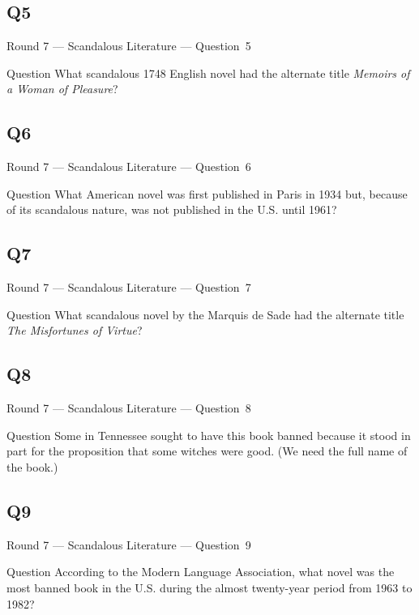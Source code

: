 \documentclass[11pt]{beamer}
\begin{document}
\subsection*{Q5}
\begin{frame}[t]{Round 7 --- Scandalous Literature --- \mbox{Question 5}}
\vspace{-0.5em}
\begin{block}{Question}
What scandalous 1748 English novel had the alternate title \emph{Memoirs of a Woman of Pleasure}?
\end{block}
\end{frame}
\subsection*{Q6}
\begin{frame}[t]{Round 7 --- Scandalous Literature --- \mbox{Question 6}}
\vspace{-0.5em}
\begin{block}{Question}
What American novel was  first published in Paris in 1934 but, because of its scandalous nature, was not published in the U.S. until 1961? 
\end{block}
\end{frame}
\subsection*{Q7}
\begin{frame}[t]{Round 7 --- Scandalous Literature --- \mbox{Question 7}}
\vspace{-0.5em}
\begin{block}{Question}
What scandalous novel by the Marquis de Sade had the alternate title \emph{The Misfortunes of Virtue}?
\end{block}
\end{frame}
\subsection*{Q8}
\begin{frame}[t]{Round 7 --- Scandalous Literature --- \mbox{Question 8}}
\vspace{-0.5em}
\begin{block}{Question}
Some in Tennessee sought to have this book banned because it stood in part for the proposition that some witches were good. (We need the full name of the book.)
\end{block}
\end{frame}
\subsection*{Q9}
\begin{frame}[t]{Round 7 --- Scandalous Literature --- \mbox{Question 9}}
\vspace{-0.5em}
\begin{block}{Question}
According to the Modern Language Association, what novel was the most banned book in the U.S. during the almost twenty-year period from 1963 to 1982?
\end{block}
\end{frame}
\end{document}
